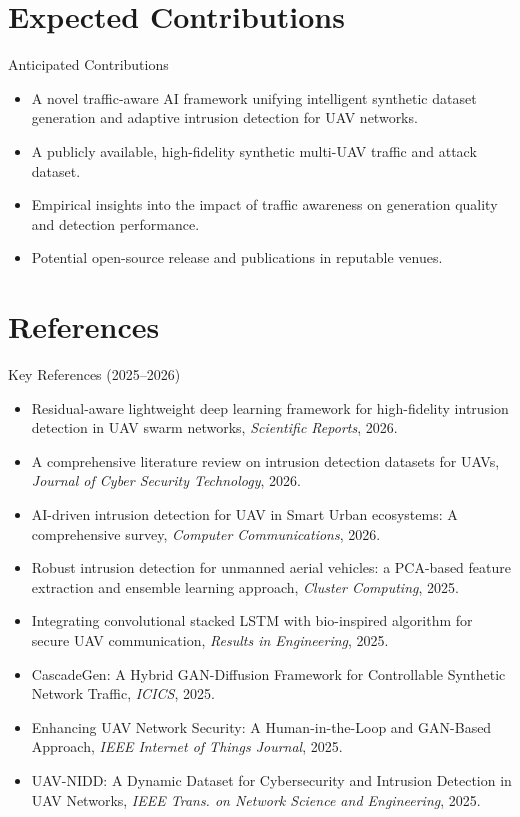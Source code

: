 \documentclass[10pt]{beamer}
\begin{document}
\section{Expected Contributions}
\begin{frame}{Anticipated Contributions}
    \begin{itemize}
        \item A novel traffic-aware AI framework unifying intelligent synthetic dataset generation and adaptive intrusion detection for UAV networks.
        \item A publicly available, high-fidelity synthetic multi-UAV traffic and attack dataset.
        \item Empirical insights into the impact of traffic awareness on generation quality and detection performance.
        \item Potential open-source release and publications in reputable venues.
    \end{itemize}
\end{frame}

\section{References}
\begin{frame}{Key References (2025–2026)}
    \footnotesize
    \begin{itemize}
        \item Residual-aware lightweight deep learning framework for high-fidelity intrusion detection in UAV swarm networks, \textit{Scientific Reports}, 2026.
        \item A comprehensive literature review on intrusion detection datasets for UAVs, \textit{Journal of Cyber Security Technology}, 2026.
        \item AI-driven intrusion detection for UAV in Smart Urban ecosystems: A comprehensive survey, \textit{Computer Communications}, 2026.
        \item Robust intrusion detection for unmanned aerial vehicles: a PCA-based feature extraction and ensemble learning approach, \textit{Cluster Computing}, 2025.
        \item Integrating convolutional stacked LSTM with bio-inspired algorithm for secure UAV communication, \textit{Results in Engineering}, 2025.
        \item CascadeGen: A Hybrid GAN-Diffusion Framework for Controllable Synthetic Network Traffic, \textit{ICICS}, 2025.
        \item Enhancing UAV Network Security: A Human-in-the-Loop and GAN-Based Approach, \textit{IEEE Internet of Things Journal}, 2025.
        \item UAV-NIDD: A Dynamic Dataset for Cybersecurity and Intrusion Detection in UAV Networks, \textit{IEEE Trans. on Network Science and Engineering}, 2025.
    \end{itemize}
\end{frame}
\end{document}
